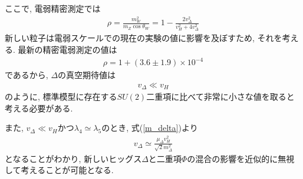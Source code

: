 ここで, 電弱精密測定では
\begin{align}
  \rho = \frac{m_W^2}{m_Z\cos\theta_W} = 1 - \frac{2v_\Delta^2}{v_H^2 + 4v_\Delta^2}
\end{align}
新しい粒子は電弱スケールでの現在の実験の値に影響を及ぼすため, それを考える.
最新の精密電弱測定の値は
\begin{align}
  \rho =1 + (3.6 ± 1.9)\times10^{-4}
\end{align}
であるから, $\Delta$の真空期待値は
\begin{align}
  v_\Delta \ll v_H \nonumber
\end{align}
のように, 標準模型に存在する$SU(2)$二重項に比べて非常に小さな値を取ると考える必要がある.

また, $v_\Delta \ll v_H$かつ$\lambda_4\simeq\lambda_5$のとき, 式(\ref{m_delta})より
\begin{align}
  v_\Delta \simeq \frac{\mu_\Delta v_H^2}{\sqrt{2}m_\Delta^2}
\end{align}
となることがわかり, 新しいヒッグス$\Delta$と二重項$\Phi$の混合の影響を近似的に無視して考えることが可能となる.
